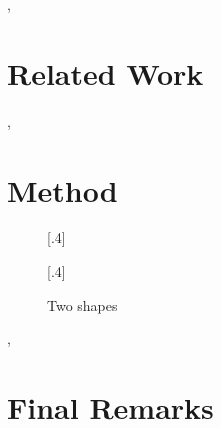 \documentclass[sigconf,authorversion]{acmart}
\begin{document}
\lipsum[1]\cite{TeXFAQ}, \cite{Downes04:amsart}

\section{Related Work}
\label{sec:related}

\lipsum[1]\cite{Fiorio15}, \cite{Brito09}

\section{Method}
\label{sec:method}

\begin{figure}[!ht]
    \centering
    [.4\textwidth]{
    }
    [.4\textwidth]{
    }
    \caption{Two shapes}\label{fig:shapes}
    \Description{}
\end{figure}

\lipsum[1]\cite{Heinz15}, \cite{Fear05}

\section{Final Remarks}
\label{sec:remarks}

\lipsum[1]\cite{Carlisle04:Textcase,Braams22:Babel}



\end{document}
